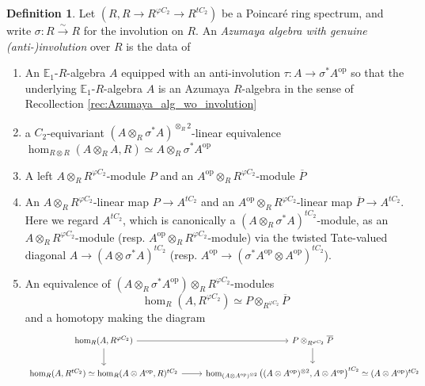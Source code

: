 \documentclass{article}
\newcommand{\EE}{\mathbb{E}}
\newcommand{\op}{\mathrm{op}} %
\theoremstyle{definition}
\newtheorem{definition}[equation]{Definition}
\begin{document}
\begin{definition}\label{defn:Azumaya_genuine_anti-inv}
    Let $ (R, R \to R^{\varphi C_2} \to R^{tC_2}) $ be a Poincaré ring spectrum, and write $ \sigma \colon R \xrightarrow{\sim} R $ for the involution on $ R $. 
    An \emph{Azumaya algebra with genuine (anti-)involution} over $ R $ is the data of 
    \begin{enumerate}[label=(\alph*)]
        \item \label{defnitem:Azumaya_alg_gi_the_involution} An $ \EE_1 $-$ R $-algebra $ A $ equipped with an anti-involution $ \tau \colon A \to \sigma^* A^\op $ so that the underlying $ \EE_1 $-$ R $-algebra $ A $ is an Azumaya $ R $-algebra in the sense of Recollection \ref{rec:Azumaya_alg_wo_involution} 
        \item \label{defnitem:Azumaya_alg_gi_underlying} a $ C_2 $-equivariant $ (A \otimes_R \sigma^* A)^{\otimes_R 2} $-linear equivalence $ \hom_{R \otimes R}(A \otimes_R A, R) \simeq A \otimes_R \sigma^* A^\op $
        \item A left $ A \otimes_{R} R^{\varphi C_2} $-module $ P $ and an $ A^\op \otimes_R R^{\varphi C_2} $-module $ \overline{P} $
        \item \label{defn_item:Azumaya_gen_inv_conn_map} An $ A \otimes_R R^{\varphi C_2} $-linear map $ P \to A^{tC_2} $ and an $ A^\op \otimes_R R^{\varphi C_2} $-linear map $ \overline{P} \to A^{tC_2} $. 
        Here we regard $ A^{tC_2} $, which is canonically a $ (A \otimes_R \sigma^* A)^{tC_2} $-module, as an $ A \otimes_R R^{\varphi C_2} $-module (resp. $ A^\op \otimes_R R^{\varphi C_2} $-module) via the twisted Tate-valued diagonal $ A \to (A \otimes \sigma^* A)^{tC_2} $ (resp. $ A^\op \to (\sigma^* A^\op \otimes A^\op)^{tC_2} $). 
        \item \label{defn_item:Azumaya_gen_inv_geom_fixpt} An equivalence of $ \left(A \otimes_R \sigma^* A^\op\right) \otimes_R R^{\varphi C_2} $-modules 
        \begin{equation*}
            \hom_R(A, R^{\varphi C_2}) \simeq P \otimes_{R^{\varphi C_2}} \overline{P}
        \end{equation*}
        and a homotopy making the diagram 
        \begin{equation*}
        \begin{tikzcd}
            \hom_R(A, R^{\varphi C_2}) \ar[r] \ar[d] & P \otimes_{R^{\varphi C_2}} \overline{P} \ar[d] \\
            \hom_R(A, R^{tC_2}) \simeq \hom_R(A \otimes A^\op, R)^{tC_2} \ar[r] & \hom_{(A \otimes A^\op)^{\otimes 2}}\left((A \otimes A^\op)^{\otimes 2}, A \otimes A^\op\right)^{tC_2} \simeq (A \otimes A^\op)^{tC_2}

\end{tikzcd}
\end{equation*}
\end{enumerate}
\end{definition}
\end{document}
